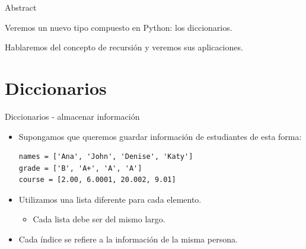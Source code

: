 \documentclass[mathserif]{beamer}
\subtitle{%
  \bfseries{Diccionarios y recursión}\\%
}
\begin{document}


\begin{frame}{Abstract}
    
	\begin{blurb}
		Veremos un nuevo tipo {\blue compuesto} en Python: los diccionarios.
		
		Hablaremos del concepto de recursión y veremos sus aplicaciones.
		
	\end{blurb}
\end{frame}


\section{Diccionarios}

\begin{frame}[fragile]{Diccionarios - almacenar información}
    \begin{itemize}
        \item Supongamos que queremos guardar información de estudiantes de esta forma:
\begin{lstlisting}
names = ['Ana', 'John', 'Denise', 'Katy']
grade = ['B', 'A+', 'A', 'A']
course = [2.00, 6.0001, 20.002, 9.01]
\end{lstlisting}

        \item Utilizamos una {\blue lista diferente} para cada elemento.
        \begin{itemize}
            \item Cada lista debe ser del mismo {\blue largo}.
        \end{itemize}
        
        \item Cada índice se refiere a la información de la misma persona.
    \end{itemize}
\end{frame}
\end{document}
